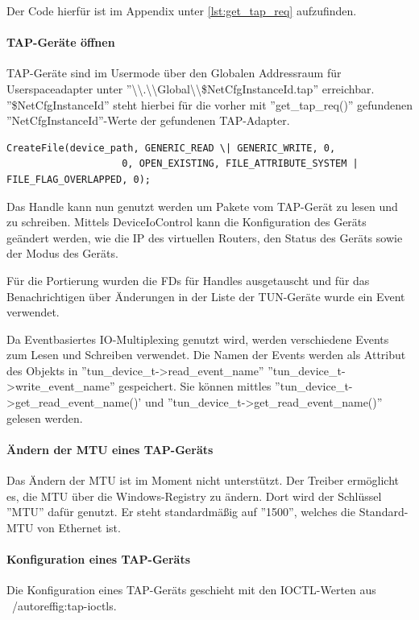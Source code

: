 Der Code hierfür ist im Appendix unter \autoref{lst:get_tap_req} aufzufinden.

\paragraph{TAP-Geräte öffnen}
TAP-Geräte sind im Usermode über den Globalen Addressraum für Userspaceadapter
unter ''\textbackslash{}\textbackslash{}.\textbackslash{}\textbackslash{}Global\textbackslash{}\textbackslash{}\$NetCfgInstanceId.tap'' erreichbar.
''\$NetCfgInstanceId'' steht hierbei für die vorher mit ''get\_tap\_req()'' gefundenen
''NetCfgInstanceId''-Werte der gefundenen TAP-Adapter.

\begin{lstlisting}[numbers=none]
CreateFile(device_path, GENERIC_READ \| GENERIC_WRITE, 0,
                    0, OPEN_EXISTING, FILE_ATTRIBUTE_SYSTEM | FILE_FLAG_OVERLAPPED, 0);
\end{lstlisting}

Das Handle kann nun genutzt werden um Pakete vom TAP-Gerät zu lesen und zu schreiben.
Mittels DeviceIoControl kann die Konfiguration des Geräts geändert werden,
wie die IP des virtuellen Routers, den Status des Geräts sowie der Modus des Geräts.

Für die Portierung wurden die \acp{FD} für Handles ausgetauscht und für das Benachrichtigen
über Änderungen in der Liste der TUN-Geräte wurde ein Event verwendet.

Da Eventbasiertes IO-Multiplexing genutzt wird, werden verschiedene Events zum Lesen
und Schreiben verwendet.
Die Namen der Events werden als Attribut des Objekts in ''tun\_device\_t->read\_event\_name''
''tun\_device\_t->write\_event\_name'' gespeichert. Sie können mittles ''tun\_device\_t->get\_read\_event\_name()'
und ''tun\_device\_t->get\_read\_event\_name()'' gelesen werden.

\paragraph{Ändern der MTU eines TAP-Geräts}
Das Ändern der \ac{MTU} ist im Moment nicht unterstützt. Der Treiber ermöglicht es,
die \ac{MTU} über die Windows-Registry zu ändern. Dort wird der Schlüssel ''MTU''
dafür genutzt. Er steht standardmäßig auf ''1500'', welches die Standard-\ac{MTU}
von Ethernet ist.
\paragraph{Konfiguration eines TAP-Geräts}
Die Konfiguration eines TAP-Geräts geschieht mit den IOCTL-Werten aus ~/autoref{fig:tap-ioctls}.

